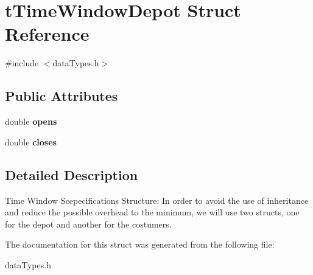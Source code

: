 \hypertarget{structt_time_window_depot}{
\section{tTimeWindowDepot Struct Reference}
\label{structt_time_window_depot}
}


{\ttfamily \#include $<$dataTypes.h$>$}

\subsection*{Public Attributes}
\begin{DoxyCompactItemize}
\item 
\hypertarget{structt_time_window_depot_ac370190b266c1e769fffa8ae0a71f348}{
double {\bfseries opens}}
\label{structt_time_window_depot_ac370190b266c1e769fffa8ae0a71f348}

\item 
\hypertarget{structt_time_window_depot_afd847261d506f4a7e159716f2c8b8788}{
double {\bfseries closes}}
\label{structt_time_window_depot_afd847261d506f4a7e159716f2c8b8788}

\end{DoxyCompactItemize}


\subsection{Detailed Description}
Time Window Scepecifications Structure: In order to avoid the use of inheritance and reduce the possible overhead to the minimum, we will use two structs, one for the depot and another for the costumers. 

The documentation for this struct was generated from the following file:\begin{DoxyCompactItemize}
\item 
dataTypes.h\end{DoxyCompactItemize}
